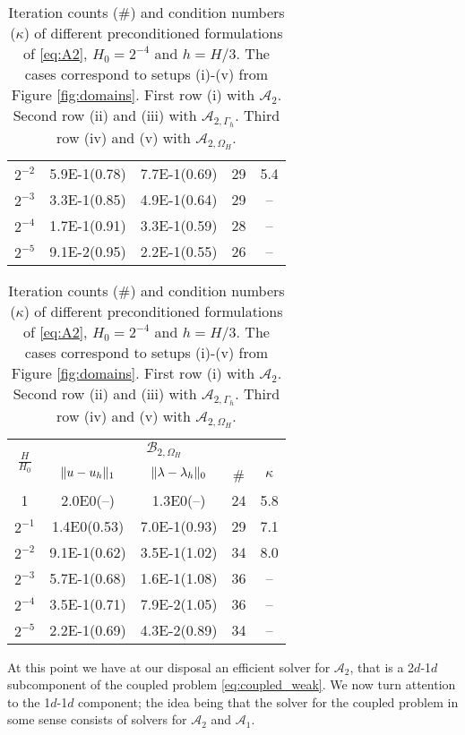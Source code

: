 \begin{table}
{\begin{minipage}{0.49\textwidth}
\begin{center}
\begin{tabular}{c|cccc}
$2^{-2}$ & 5.9E-1(0.78) & 7.7E-1(0.69) & 29 &5.4\\
$2^{-3}$ & 3.3E-1(0.85) & 4.9E-1(0.64) & 29 &-- \\
$2^{-4}$ & 1.7E-1(0.91) & 3.3E-1(0.59) & 28 &-- \\
$2^{-5}$ & 9.1E-2(0.95) & 2.2E-1(0.55) & 26 &-- \\
      \hline
  \end{tabular}
  \end{center}
  \end{minipage}
  }
  \scriptsize{%
    \begin{minipage}{0.49\textwidth}
  \begin{center}
    \begin{tabular}{c|cccc}
      \hline
      \multirow{2}{*}{$\frac{H}{H_0}$} & \multicolumn{4}{c}{$\mathcal{B}_{2, \Omega_H}$}\\
      \cline{2-5}
      & $\lVert{u-u_h}\rVert_1$ & $\lVert{\lambda-\lambda_h}\rVert_0$ & \# & $\kappa$\\
      \hline
1       & 2.0E0(--) & 1.3E0(--)        & 24 & 5.8\\
$2^{-1}$ & 1.4E0(0.53) & 7.0E-1(0.93)   & 29 & 7.1\\
$2^{-2}$ & 9.1E-1(0.62) & 3.5E-1(1.02)  & 34 & 8.0\\
$2^{-3}$ & 5.7E-1(0.68) & 1.6E-1(1.08)  & 36 & -- \\
$2^{-4}$ & 3.5E-1(0.71) & 7.9E-2(1.05)  & 36 & -- \\
$2^{-5}$ & 2.2E-1(0.69) & 4.3E-2(0.89)  & 34 & -- \\
      \hline
  \end{tabular}
  \end{center}
  \end{minipage}
  }
  \caption{Iteration counts (\#) and condition numbers ($\kappa$) of different
    preconditioned formulations of \eqref{eq:A2}, $H_0=2^{-4}$ and $h=H/3$.
    The cases correspond to setups (i)-(v) from Figure \ref{fig:domains}.
    First row (i) with $\mathcal{A}_2$. Second row (ii) and (iii) with
    $\mathcal{A}_{2, \Gamma_h}$. Third row (iv) and (v) with $\mathcal{A}_{2, \Omega_H}$.
  }
  \label{tab:A2}
\end{table}

At this point we have at our disposal an efficient solver for $\mathcal{A}_2$,
that is a 2$d$-1$d$ subcomponent of the coupled problem \eqref{eq:coupled_weak}.
We now turn attention to the 1$d$-1$d$ component; the idea being that the solver
for the coupled problem in some sense consists of solvers for $\mathcal{A}_2$ and
$\mathcal{A}_1$.
